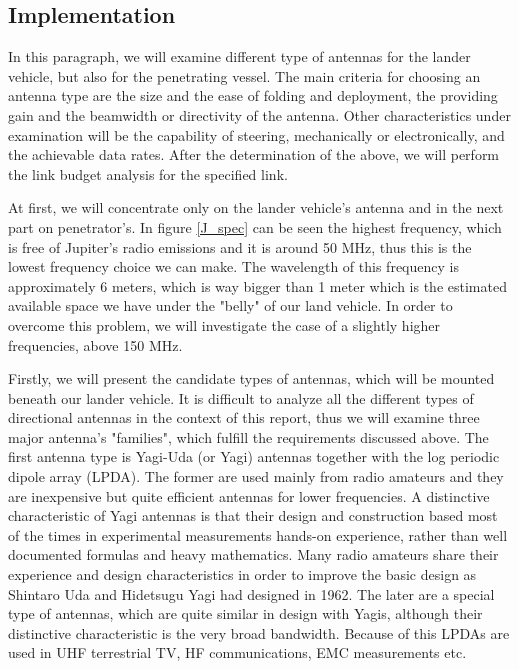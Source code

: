 
\subsection{Implementation}
In this paragraph, we will examine different type of antennas for the lander vehicle, but also for the penetrating vessel. The main criteria for choosing an antenna type are the size and the ease of folding and deployment, the providing gain and the beamwidth or directivity of the antenna. Other characteristics under examination will be the capability of steering, mechanically or electronically, and the achievable data rates. After the determination of the above, we will perform the link budget analysis for the specified link. 

At first, we will concentrate only on the lander vehicle's antenna and in the next part on penetrator's. In figure \ref{J_spec} can be seen the highest frequency, which is free of Jupiter's radio emissions and it is around 50 MHz, thus this is the lowest frequency choice we can make. The wavelength of this frequency is approximately 6 meters, which is way bigger than 1 meter which is the estimated available space we have under the "belly" of our land vehicle. In order to overcome this problem, we will investigate the case of a slightly higher frequencies, above 150 MHz. 

Firstly, we will present the candidate types of antennas, which will be mounted beneath our lander vehicle. It is difficult to analyze all the different types of directional antennas in the context of this report, thus we will examine three major antenna's "families", which fulfill the requirements discussed above. The first antenna type is Yagi-Uda (or Yagi) antennas together with the log periodic dipole array (LPDA). The former are used mainly from radio amateurs and they are inexpensive but quite efficient antennas for lower frequencies. A distinctive characteristic of Yagi antennas is that their design and construction based most of the times in experimental measurements hands-on experience, rather than well documented formulas and heavy mathematics. Many radio amateurs share their experience and design characteristics in order to improve the basic design as Shintaro Uda and Hidetsugu Yagi had designed in 1962. The later are a special type of antennas, which are quite similar in design with Yagis, although their distinctive characteristic is the very broad bandwidth. Because of this LPDAs are used in UHF terrestrial TV, HF communications, EMC measurements etc.

